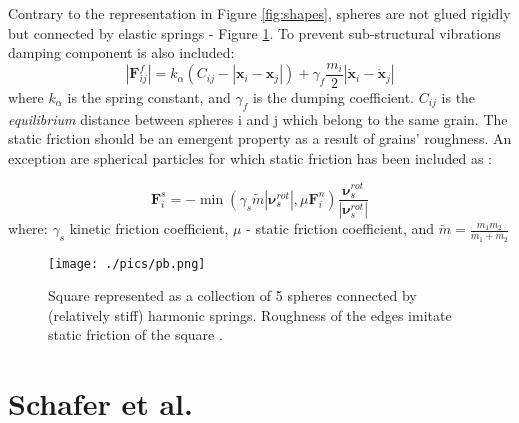 \documentclass[10pt,a4paper]{article}
\begin{document}
Contrary to the representation in Figure \ref{fig:shapes}, spheres are not glued rigidly but connected by elastic springs - Figure \ref{fig:pb}.
To prevent sub-structural vibrations damping component is also included:
\begin{equation}
 |\mathbf{F}^{f}_{ij}| =k_\alpha \left(C_{ij} -  |\mathbf{x}_{i} - \mathbf{x}_j| \right) + \gamma_{f} \frac{m_i}{2} |\dot{\mathbf{x}}_{i} - \dot{\mathbf{x}}_j|
\end{equation}
where $k_\alpha$ is the spring constant, and $\gamma_{f}$ is the dumping coefficient. $C_{ij}$ is the \textit{equilibrium} distance between spheres i and j
which belong to the same grain.
The static friction should be an emergent property as a result of grains' roughness. 
An exception are spherical particles for which static friction has been included as \cite{cs79, herr93, herr94}:
 
\begin{equation}
\mathbf{F}^{s}_{i} = - \min(\gamma_{s} \tilde{m} |\mathbf{\nu}^{rot}_s| , \mu \mathbf{F}^{n}_{i} ) \frac{\mathbf{\nu}^{rot}_s}{|\mathbf{\nu}^{rot}_s|}
\end{equation}
where:
$\gamma_s$ kinetic friction coefficient, $\mu$ - static friction coefficient, and $\tilde{m} = \frac{m_1m_2}{m_1+m_2}$



\begin{figure}[tb]
\centering
\texttt{[image: ./pics/pb.png]}
\caption{Square represented as a collection of 5 spheres connected by (relatively stiff) harmonic springs. Roughness of the edges imitate static friction of the square \cite{pb93}.}
\label{fig:pb}
\end{figure}

\section{Schafer et al. \cite{sw95, schafer96}}
\end{document}
